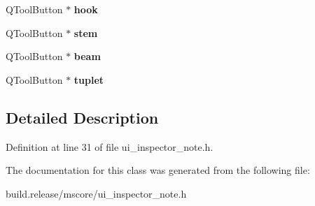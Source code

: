 \begin{DoxyCompactItemize}
Q\+Tool\+Button $\ast$ {\bfseries hook}
\item 
\mbox{\label{class_ui___inspector_note_a987fc35a626aecdc7df7cb20c190367a}} 
Q\+Tool\+Button $\ast$ {\bfseries stem}
\item 
\mbox{\label{class_ui___inspector_note_aa336d5fd386a0e018fee38a9cbf52a73}} 
Q\+Tool\+Button $\ast$ {\bfseries beam}
\item 
\mbox{\label{class_ui___inspector_note_a0046d10dc793d6666092b660cba791e5}} 
Q\+Tool\+Button $\ast$ {\bfseries tuplet}
\end{DoxyCompactItemize}


\subsection{Detailed Description}


Definition at line 31 of file ui\+\_\+inspector\+\_\+note.\+h.



The documentation for this class was generated from the following file\+:\begin{DoxyCompactItemize}
\item 
build.\+release/mscore/ui\+\_\+inspector\+\_\+note.\+h\end{DoxyCompactItemize}
